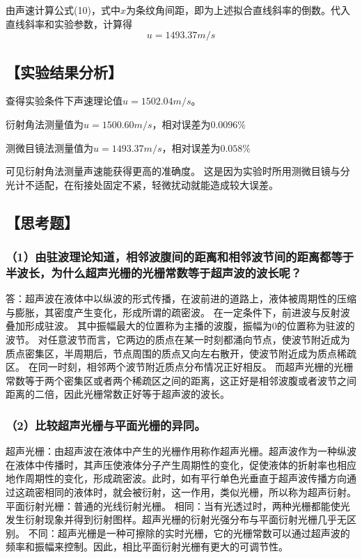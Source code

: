 \documentclass[12pt,a4paper,UTF8]{ctexart}
\begin{document}
		由声速计算公式(10)，式中$x$为条纹角间距，即为上述拟合直线斜率的倒数。代入直线斜率和实验参数，计算得
		$$
		u = 1493.37 m/s
		$$

\subsection*{【实验结果分析】}
查得实验条件下声速理论值$u = 1502.04 m/s$。

衍射角法测量值为$u = 1500.60 m/s$，相对误差为$0.0096\%$

测微目镜法测量值为$u = 1493.37 m/s$，相对误差为$0.058\%$

可见衍射角法测量声速能获得更高的准确度。
这是因为实验时所用测微目镜与分光计不适配，在衔接处固定不紧，轻微扰动就能造成较大误差。



\subsection*{【思考题】}
\subsubsection*{（1）由驻波理论知道，相邻波腹间的距离和相邻波节间的距离都等于半波长，为什么超声光栅的光栅常数等于超声波的波长呢？}
答：超声波在液体中以纵波的形式传播，在波前进的道路上，液体被周期性的压缩与膨胀，其密度产生变化，形成所谓的疏密波。
在一定条件下，前进波与反射波叠加形成驻波。
其中振幅最大的位置称为主播的波腹，振幅为0的位置称为驻波的波节。
对任意波节而言，它两边的质点在某一时刻都涌向节点，使波节附近成为质点密集区，半周期后，节点周围的质点又向左右散开，使波节附近成为质点稀疏区。
在同一时刻，相邻两个波节附近质点分布情况正好相反。
而超声光栅的光栅常数等于两个密集区或者两个稀疏区之间的距离，这正好是相邻波腹或者波节之间距离的二倍，因此光栅常数正好等于超声波的波长。

\subsubsection*{（2）比较超声光栅与平面光栅的异同。}
超声光栅：由超声波在液体中产生的光栅作用称作超声光栅。超声波作为一种纵波在液体中传播时，其声压使液体分子产生周期性的变化，促使液体的折射率也相应地作周期性的变化，形成疏密波。此时，如有平行单色光垂直于超声波传播方向通过这疏密相同的液体时，就会被衍射，这一作用，类似光栅，所以称为超声衍射。
平面衍射光栅：普通的光线衍射光栅。
相同：当有光透过时，两种光栅都能使光发生衍射现象并得到衍射图样。超声光栅的衍射光强分布与平面衍射光栅几乎无区别。
不同：超声光栅是一种可擦除的实时光栅，它的光栅常数可以通过超声波的频率和振幅来控制。因此，相比平面衍射光栅有更大的可调节性。
\end{document}

